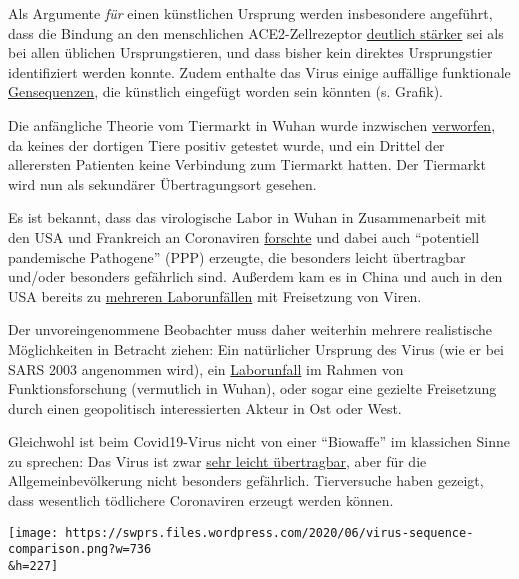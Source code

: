 Als Argumente \emph{für} einen künstlichen Ursprung werden insbesondere
angeführt, dass die Bindung an den menschlichen ACE2-Zellrezeptor
\href{https://arxiv.org/abs/2005.06199}{deutlich stärker} sei als bei
allen üblichen Ursprungstieren, und dass bisher kein direktes
Ursprungstier identifiziert werden konnte. Zudem enthalte das Virus
einige auffällige funktionale
\href{https://gmwatch.org/en/news/latest-news/19403-wuhan-and-us-scientists-used-undetectable-methods-of-genetic-engineering-on-bat-coronaviruses}{Gensequenzen},
die künstlich eingefügt worden sein könnten (s. Grafik).

Die anfängliche Theorie vom Tiermarkt in Wuhan wurde inzwischen
\href{https://thebulletin.org/2020/06/did-the-sars-cov-2-virus-arise-from-a-bat-coronavirus-research-program-in-a-chinese-laboratory-very-possibly}{verworfen},
da keines der dortigen Tiere positiv getestet wurde, und ein Drittel der
allerersten Patienten keine Verbindung zum Tiermarkt hatten. Der
Tiermarkt wird nun als sekundärer Übertragungsort gesehen.

Es ist bekannt, dass das virologische Labor in Wuhan in Zusammenarbeit
mit den USA und Frankreich an Coronaviren
\href{https://www.newsweek.com/dr-fauci-backed-controversial-wuhan-lab-millions-us-dollars-risky-coronavirus-research-1500741}{forschte}
und dabei auch ``potentiell pandemische Pathogene'' (PPP) erzeugte, die
besonders leicht übertragbar und/oder besonders gefährlich sind.
Außerdem kam es in China und auch in den USA bereits zu
\href{https://www.independentsciencenews.org/health/the-long-history-of-accidental-laboratory-releases-of-potential-pandemic-pathogens/}{mehreren
Laborunfällen} mit Freisetzung von Viren.

Der unvoreingenommene Beobachter muss daher weiterhin mehrere
realistische Möglichkeiten in Betracht ziehen: Ein natürlicher Ursprung
des Virus (wie er bei SARS 2003 angenommen wird), ein
\href{https://project-evidence.github.io/}{Laborunfall} im Rahmen von
Funktionsforschung (vermutlich in Wuhan), oder sogar eine gezielte
Freisetzung durch einen geopolitisch interessierten Akteur in Ost oder
West.

Gleichwohl ist beim Covid19-Virus nicht von einer ``Biowaffe'' im
klassichen Sinne zu sprechen: Das Virus ist zwar
\href{https://leelabvirus.host/covid19/origins-part2}{sehr leicht
übertragbar}, aber für die Allgemeinbevölkerung nicht besonders
gefährlich. Tierversuche haben gezeigt, dass wesentlich tödlichere
Coronaviren erzeugt werden können.

\texttt{[image: https://swprs.files.wordpress.com/2020/06/virus-sequence-comparison.png?w=736\\\&h=227]}

